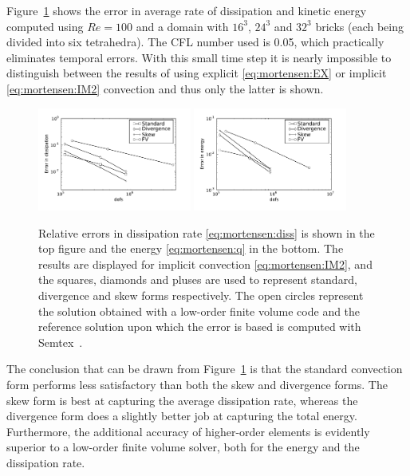 Figure~\ref{fig:mortensen:dissipation} shows the error in average
rate of dissipation and kinetic energy computed using $Re=100$ and
a  domain with $16^3$, $24^3$ and $32^3$ bricks (each
being divided into six tetrahedra). The CFL number used is 0.05, which
practically eliminates temporal errors. With this small time step it is
nearly impossible to distinguish between the results of using explicit
\eqref{eq:mortensen:EX} or implicit \eqref{eq:mortensen:IM2} convection
and thus only the latter is shown.
\begin{figure}
\includegraphics[width=0.45\textwidth]{chapters/mortensen/pdf/TG_disserror_model_0_cfl_0_05_Re_100_dofs.pdf}
\includegraphics[width=0.45\textwidth]{chapters/mortensen/pdf/TG_energyerror_model_0_cfl_0_05_Re_100_dofs.pdf}
  \caption{Relative errors in dissipation rate \eqref{eq:mortensen:diss} is
      shown in the top figure and the energy \eqref{eq:mortensen:q} in the bottom. The
	  results are displayed for implicit convection
	  \eqref{eq:mortensen:IM2}, and the squares, diamonds and pluses
	  are used to represent standard, divergence and skew forms
	  respectively. The open circles represent the solution obtained
	  with a low-order finite volume code and the reference solution
	  upon which the error is based is computed with
	  Semtex~\citep{Blackburn2009}. }
  \label{fig:mortensen:dissipation}
\end{figure}
The conclusion that can be drawn from
Figure~\ref{fig:mortensen:dissipation} is that the standard convection
form performs less satisfactory than both the skew and divergence
forms. The skew form is best at capturing the average dissipation rate,
whereas the divergence form does a slightly better job at capturing the
total energy. Furthermore, the additional accuracy of
higher-order elements is evidently superior to a low-order finite volume
solver, both for the energy and the dissipation rate.

